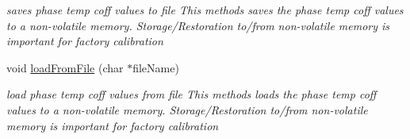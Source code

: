 \begin{DoxyCompactItemize}
\begin{DoxyCompactList}\small\item\em saves phase temp coff values to file This methods saves the phase temp coff values to a non-\/volatile memory. Storage/\+Restoration to/from non-\/volatile memory is important for factory calibration \end{DoxyCompactList}\item 
void \mbox{\hyperlink{class_o_p_t3101_1_1frame_data_aca9b96c6a896ee6caab380e05ae45064}{load\+From\+File}} (char $\ast$file\+Name)
\begin{DoxyCompactList}\small\item\em load phase temp coff values from file This methods loads the phase temp coff values to a non-\/volatile memory. Storage/\+Restoration to/from non-\/volatile memory is important for factory calibration \end{DoxyCompactList}\end{DoxyCompactItemize}
